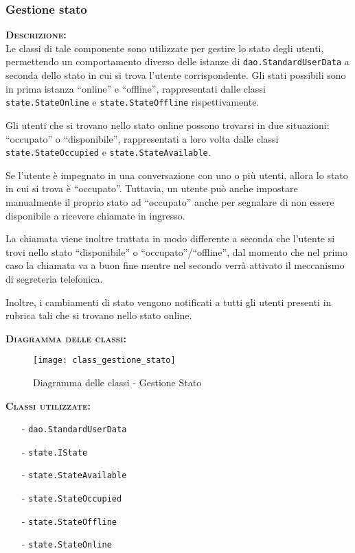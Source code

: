 \subsubsection{Gestione stato}
\begin{description}
	\item{\scshape\bfseries Descrizione:}\\
Le classi di tale componente sono utilizzate per gestire lo stato degli utenti, permettendo un comportamento diverso delle istanze di \texttt{dao.StandardUserData} a seconda dello stato in cui si trova l'utente corrispondente. Gli stati possibili sono in prima istanza ``online'' e ``offline'', rappresentati dalle classi \texttt{state.StateOnline} e \texttt{state.StateOffline} rispettivamente.

Gli utenti che si trovano nello stato online possono trovarsi in due situazioni: ``occupato'' o ``disponibile'', rappresentati a loro volta dalle classi \texttt{state.StateOccupied} e \texttt{state.StateAvailable}.

Se l'utente è impegnato in una conversazione con uno o più utenti, allora lo stato in cui si trova è ``occupato''. Tuttavia, un utente può anche impostare manualmente il proprio stato ad ``occupato'' anche per segnalare di non essere disponibile a ricevere chiamate in ingresso.
	
La chiamata viene inoltre trattata in modo differente a seconda che l'utente si trovi nello stato ``disponibile'' o ``occupato''/``offline'', dal momento che nel primo caso la chiamata va a buon fine mentre nel secondo verrà attivato il meccanismo di segreteria telefonica.
	
Inoltre, i cambiamenti di stato vengono notificati a tutti gli utenti presenti in rubrica tali che si trovano nello stato online.
	\item{\scshape\bfseries Diagramma delle classi:}
	\begin{figure}[H]
\begin{center}
\texttt{[image: class\_gestione\_stato]}
\caption{Diagramma delle classi - Gestione Stato}\label{fig:gestione_stato}
\end{center}
\end{figure}
	
	\item{\scshape\bfseries Classi utilizzate:}\\ 
	\begin{itemize}[noitemsep,nolistsep]
		\item[-] \texttt{dao.StandardUserData}
	    \item[-] \texttt{state.IState}
	    \item[-] \texttt{state.StateAvailable}
	    \item[-] \texttt{state.StateOccupied}
	    \item[-] \texttt{state.StateOffline}
	    \item[-] \texttt{state.StateOnline}
	\end{itemize}
\end{description}


